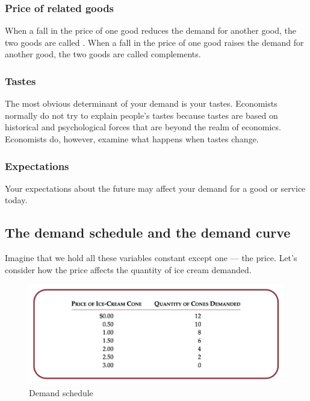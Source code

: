 \subsubsection{Price of related goods}

When a fall in the price of one good reduces the demand for another good, the two goods are called .
When a fall in the price of one good raises the demand for another good, the two goods are called complements.

\subsubsection{Tastes}

The most obvious determinant of your demand is your tastes.
Economists normally do not try to explain people’s tastes because tastes are based on historical and psychological forces that are beyond the realm of economics.
Economists do, however, examine what happens when tastes change.


\subsubsection{Expectations}

Your expectations about the future may affect your demand for a good or service today.


\subsection{The demand schedule and the demand curve}

Imagine that we hold all these variables constant except one --- the price.
Let’s consider how the price affects the quantity of ice cream demanded.

\begin{figure}[!ht]
  \centering
  \includegraphics[width=\textwidth]{pics/demand-schedule}
  \caption{Demand schedule}
  \label{fig:demand-schedule}
\end{figure}

